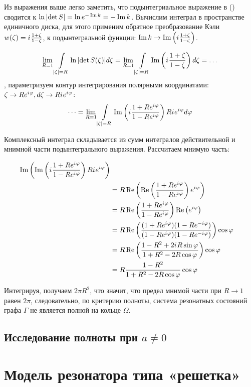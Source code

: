 Из выражения выше легко заметить, что подынтегриальное выражение в () сводится к $\ln \abs{\det S} = \ln e^{- \operatorname{Im} k} = -\operatorname{Im} k$. Вычислим интеграл в пространстве единичного диска, для этого применим обратное преобразование Кэли $w(\zeta) = {i\mkern1mu} \frac{1 + \zeta}{1 - \zeta}$, к подынтегральной функции: $\operatorname{Im} k \to \operatorname{Im} \left( {i\mkern1mu} \frac{1 + \zeta}{1 - \zeta} \right) $.

\[
  \lim\limits_{R = 1} \int\limits_{\abs{\zeta} = R} \ln \abs{\det S(\zeta)} d \zeta
= \lim\limits_{R = 1} \int\limits_{\abs{\zeta} = R} \operatorname{Im} \left( {i\mkern1mu} \frac{1 + \zeta}{1 - \zeta} \right)  d\zeta = \dots
\]
, параметризуем контур интегрирования полярными координатами: $\zeta \to R e^{{i\mkern1mu} \varphi}, d\zeta \to R {i\mkern1mu} e^{{i\mkern1mu} \varphi}$:
\[
\dots = \lim\limits_{R = 1} \int\limits_{\abs{\zeta} = R} \operatorname{Im} \left( {i\mkern1mu} \frac{1 + R e^{{i\mkern1mu} \varphi}}{1 - R e^{{i\mkern1mu} \varphi}} \right) R {i\mkern1mu} e^{{i\mkern1mu} \varphi} d\varphi
\]

Комплексный интеграл складывается из сумм интегралов действительной и мнимной части подынтегрального выражения. Рассчитаем мнимую часть:

\begin{align*}
   \operatorname{Im} \left(  \operatorname{Im} \left( {i\mkern1mu} \frac{1 + R e^{{i\mkern1mu} \varphi}}{1 - R e^{{i\mkern1mu} \varphi}} \right) R {i\mkern1mu} e^{{i\mkern1mu} \varphi} \right)
\\ &= R \operatorname{Re} \left(  \operatorname{Re} \left( \frac{1 + R e^{{i\mkern1mu} \varphi}}{1 - R e^{{i\mkern1mu} \varphi}} \right) e^{{i\mkern1mu} \varphi} \right)
\\ &= R \operatorname{Re} \left( \frac{1 + R e^{{i\mkern1mu} \varphi}}{1 - R e^{{i\mkern1mu} \varphi}} \right) \operatorname{Re} \left(   e^{{i\mkern1mu} \varphi} \right)
\\ &= R \operatorname{Re} \left( \frac{(1 + R e^{{i\mkern1mu} \varphi}) (1 - R e^{-{i\mkern1mu} \varphi}) }{(1 - R e^{{i\mkern1mu} \varphi}) (1 - R e^{-{i\mkern1mu} \varphi})} \right) \cos \varphi
\\ &= R \operatorname{Re} \left( \frac{1 - R^2 + 2 {i\mkern1mu} R \sin \varphi}{1 + R^2 - 2 R \cos \varphi} \right) \cos \varphi
\\ &= R \frac{1 - R^2}{1 + R^2 - 2 R \cos \varphi} \cos \varphi 
\end{align*}


Интегрируя, получаем $2 \pi R^2$, что значит, что предел мнимой части при $R \to 1$ равен $2 \pi$, следовательно, по критерию полноты, система резонатных состояний графа $\Gamma$ не является полной на кольце $\Omega$.



\subsection{Исследование полноты при $a \ne 0$}




\section{Модель резонатора типа «решетка»}

